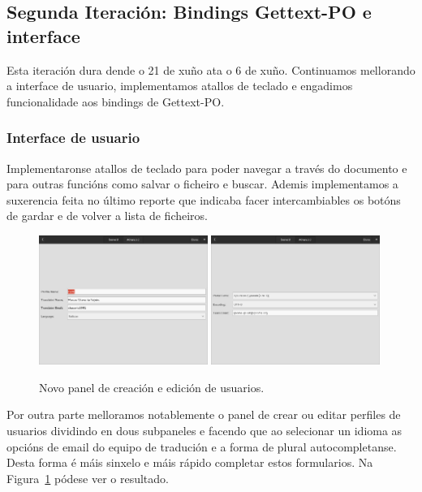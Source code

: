 \subsection{Segunda Iteración: Bindings Gettext-PO e interface}
Esta iteración dura dende o 21 de xuño ata o 6 de xuño. Continuamos mellorando a interface de usuario, implementamos atallos de teclado e engadimos funcionalidade aos bindings de Gettext-PO.

\subsubsection{Interface de usuario}
Implementaronse atallos de teclado para poder navegar a través do documento e para outras funcións como salvar o ficheiro e buscar. Ademis implementamos a suxerencia feita no último reporte que indicaba facer intercambiables os botóns de gardar e de volver a lista de ficheiros.

\begin{figure}[h!]
    \centering
    \includegraphics[width=0.49\textwidth]{img/gsoc2_it2_ui1.png}
    \includegraphics[width=0.49\textwidth]{img/gsoc2_it2_ui2.png}
    \caption{Novo panel de creación e edición de usuarios.}
    \label{fig:gsoc2_it2_ui1}
\end{figure}

Por outra parte melloramos notablemente o panel de crear ou editar perfiles de usuarios dividindo en dous subpaneles e facendo que ao selecionar un idioma as opcións de email do equipo de tradución e a forma de plural autocompletanse. Desta forma é máis sinxelo e máis rápido completar estos formularios. Na Figura~\ref{fig:gsoc2_it2_ui1} pódese ver o resultado.

